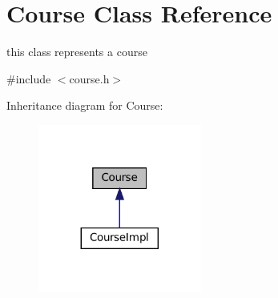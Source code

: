 \hypertarget{classCourse}{}\section{Course Class Reference}
\label{classCourse}


this class represents a course  




{\ttfamily \#include $<$course.\+h$>$}



Inheritance diagram for Course\+:
\nopagebreak
\begin{figure}[H]
\begin{center}
\leavevmode
\includegraphics[width=152pt]{classCourse__inherit__graph}
\end{center}
\end{figure}
